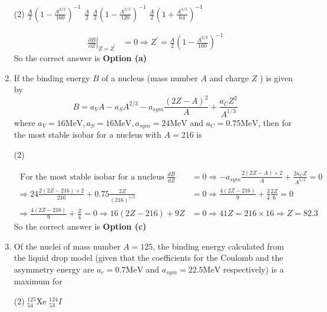 \begin{enumerate}
	 \begin{tasks}(2)
		\task[\textbf{a.}]$\frac{A}{2}\left(1-\frac{A^{2 / 3}}{160}\right)^{-1}$
		\task[\textbf{b.}]$\frac{A}{2}$
		\task[\textbf{c.}] $\frac{A}{2}\left(1-\frac{A^{2 / 3}}{120}\right)^{-1}$
		\task[\textbf{d.}] $\frac{A}{2}\left(1+\frac{A^{4 / 3}}{64}\right)^{-1}$
	\end{tasks}
\begin{answer}
	$$
	\begin{aligned}
	\left.\frac{\partial B}{\partial Z}\right|_{Z=Z^{\prime}}&=0 \Rightarrow Z^{\prime}=\frac{A}{2}\left(1-\frac{A^{2 / 3}}{160}\right)^{-1}
	\end{aligned}
	$$
		So the correct answer is \textbf{Option (a)}
\end{answer}
	\item If the binding energy $B$ of a nucleus (mass number $A$ and charge $Z$ ) is given by
	$$
	B=a_V A-a_S A^{2 / 3}-a_{s y m} \frac{(2 Z-A)^2}{A}+\frac{a_C Z^2}{A^{1 / 3}}
	$$
	where $a_V=16 \mathrm{MeV}, a_S=16 \mathrm{MeV}, a_{s y m}=24 \mathrm{MeV}$ and $a_C=0.75 \mathrm{MeV}$, then for the most stable isobar for a nucleus with $A=216$ is
	 \begin{tasks}(2)
	\end{tasks}
\begin{answer}
	$$
	\begin{aligned}
	\text { For the most stable isobar for a nucleus } \frac{d B}{d Z}&=0 \Rightarrow-a_{s y m} \frac{2(2 Z-A) \times 2}{A}+\frac{2 a_C Z}{A^{1 / 3}}=0\\
	\Rightarrow 24 \frac{2(2 Z-216) \times 2}{216}+0.75 \frac{2 Z}{(216)^{1 / 3}}&=0 \Rightarrow \frac{4(2 Z-216)}{9}+\frac{3}{4} \frac{2 Z}{6}=0\\
	\Rightarrow \frac{4(2 Z-216)}{9}+\frac{Z}{4}=0 \Rightarrow 16(2 Z-216)+9 Z&=0 \Rightarrow 41 Z=216 \times 16 \Rightarrow Z=82.3
\end{aligned}
$$
	So the correct answer is \textbf{Option (c)}
\end{answer}
	\item Of the nuclei of mass number $A=125$, the binding energy calculated from the liquid drop model (given that the coefficients for the Coulomb and the asymmetry energy are $a_c=0.7 \mathrm{MeV}$ and $a_{s y m}=22.5 \mathrm{MeV}$ respectively) is a maximum for
	 \begin{tasks}(2)
		\task[\textbf{a.}]${ }_{54}^{125} \mathrm{Xe}$
		\task[\textbf{b.}]${ }_{53}^{124} I$

\end{tasks}
\end{enumerate}
